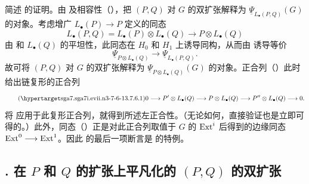 简述  的证明。由  及相容性（），把 $(P,Q)$ 对 $G$ 的双扩张解释为 $\underline\Psi_{L_\bullet(P,Q)}(G)$ 的对象。考虑增广 $L_\bullet(P)\longrightarrow P$ 定义的同态
\[
 L_\bullet(P,Q)
 =L_\bullet(P)\otimes L_\bullet(Q)
 \longrightarrow P\otimes L_\bullet(Q)
\]
由  和 $L_\bullet(Q)$ 的平坦性，此同态在 $H_0$ 和 $H_1$ 上诱导同构，从而由  诱导等价
\[
 \underline\Psi_{P\otimes L_\bullet(Q)}
 \longrightarrow
 \underline\Psi_{L_\bullet(P,Q)}.
\]
故可将 $(P,Q)$ 对 $G$ 的双扩张解释为 $\underline\Psi_{P\otimes L_\bullet(Q)}(G)$ 的对象。正合列（）此时给出链复形的正合列
\begin{equation}\tag{\SGARefTarget{sga7.sga7i.evii.n3-7-6-1}{3.7.6.1}}
 0\longrightarrow P'\otimes L_\bullet(Q)
 \longrightarrow P\otimes L_\bullet(Q)
 \longrightarrow P''\otimes L_\bullet(Q)
 \longrightarrow0.
\end{equation}
将  应用于此复形正合列，就得到所述左正合性。（无论如何，直接验证也是立即可得的。）此外，同态（）正是对此正合列取值于 $G$ 的 $\operatorname{Ext}^i$ 后得到的边缘同态 $\operatorname{Ext}^0\longrightarrow\operatorname{Ext}^1$。因此  的最后一项断言是  的特例。



\subsection*{. 在 $P$ 和 $Q$ 的扩张上平凡化的 $(P,Q)$ 的双扩张}

